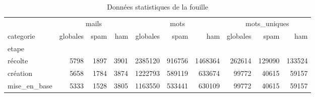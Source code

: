 \begin{table}
\caption{Données statistiques de la fouille}
\label{tab:fouillestats}
\begin{tabular}{l|rrr|rrr|rrr}
\toprule
 & \multicolumn{3}{c}{mails} & \multicolumn{3}{c}{mots} & \multicolumn{3}{c}{mots\_uniques} \\
categorie & globales & spam & ham & globales & spam & ham & globales & spam & ham \\
etape &  &  &  &  &  &  &  &  &  \\
\midrule
récolte & 5798 & 1897 & 3901 & 2385120 & 916756 & 1468364 & 262614 & 129090 & 133524 \\
création & 5658 & 1784 & 3874 & 1222793 & 589119 & 633674 & 99772 & 40615 & 59157 \\
mise\_en\_base & 5333 & 1528 & 3805 & 1163550 & 533441 & 630109 & 99772 & 40615 & 59157 \\
\bottomrule
\end{tabular}
\end{table}
